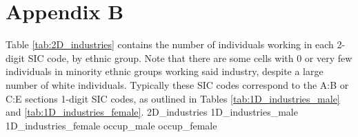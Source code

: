 \documentclass[class=article, crop=false]{standalone}
\begin{document}
\section{Appendix B}
\label{sec:appendixB}
Table \ref{tab:2D_industries} contains the number of individuals working in each 2-digit SIC code, by ethnic group. Note that there are some cells with 0 or very few individuals in minority ethnic groups working said industry, despite a large number of white individuals. Typically these SIC codes correspond to the A:B or C:E sections 1-digit SIC codes, as outlined in Tables \ref{tab:1D_industries_male} and \ref{tab:1D_industries_female}. 
{2D_industries}
\restoregeometry
{1D_industries_male}
{1D_industries_female}
{occup_male} %
{occup_female} %

\ifstandalone

\fi
\end{document}
